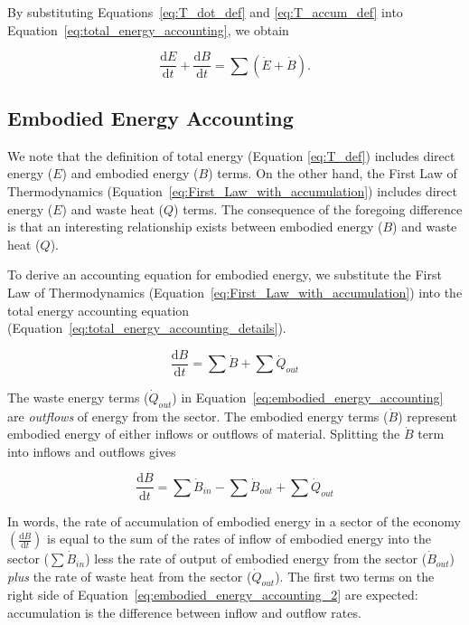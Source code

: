 By substituting Equations~\ref{eq:T_dot_def} and
\ref{eq:T_accum_def} into 
Equation~\ref{eq:total_energy_accounting},
we obtain

\begin{equation} \label{eq:total_energy_accounting_details}
	\frac{\mathrm{d}E}{\mathrm{d}t} 
	+ \frac{\mathrm{d}B}{\mathrm{d}t}
	= \sum{\left( \dot{E} 
			+ \dot{B} \right)}.
\end{equation}


\subsection{Embodied Energy Accounting}

We note that the definition of total energy 
(Equation \ref{eq:T_def}) includes direct energy ($E$) 
and embodied energy ($B$) terms. 
On the other hand, the First Law of Thermodynamics 
(Equation~\ref{eq:First_Law_with_accumulation})
includes direct energy ($E$) and waste heat ($Q$) terms. 
The consequence of the foregoing difference is that 
an interesting relationship exists between embodied energy ($B$) 
and waste heat ($Q$). 

To derive an accounting equation for embodied energy, we substitute the 
First Law of Thermodynamics (Equation~\ref{eq:First_Law_with_accumulation})
into the total energy accounting equation (Equation~\ref{eq:total_energy_accounting_details}).

\begin{equation} \label{eq:embodied_energy_accounting}
	\frac{\mathrm{d}B}{\mathrm{d}t}
	= \sum \dot{B} 
	+ \sum \dot{Q}_{out}
\end{equation}

The waste energy terms ($\dot{Q}_{out}$) 
in Equation~\ref{eq:embodied_energy_accounting}
are \emph{outflows} of energy from the sector. 
The embodied energy 
terms ($\dot{B}$) represent embodied energy of either inflows
or outflows of material. Splitting the $\dot{B}$ term
into inflows and outflows gives

\begin{equation} \label{eq:embodied_energy_accounting_2}
	\frac{\mathrm{d}B}{\mathrm{d}t}
	= \sum \dot{B}_{in}
	- \sum \dot{B}_{out} 
	+ \sum \dot{Q}_{out}
\end{equation}

In words, the rate of accumulation of embodied energy 
in a sector of the economy 
$\left( \frac{\mathrm{d}B}{\mathrm{d}t} \right)$ 
is equal to the sum of the rates of 
inflow of embodied energy into the sector 
	($\sum \dot{B}_{in}$) 
less the rate of output of embodied energy from the sector 
	($\dot{B}_{out}$) 
\emph{plus} the rate of waste heat from the sector 
	($\dot{Q}_{out}$). 
The first two terms on the right side of
Equation~\ref{eq:embodied_energy_accounting_2} are expected: 
accumulation is the difference between inflow and outflow rates. 

